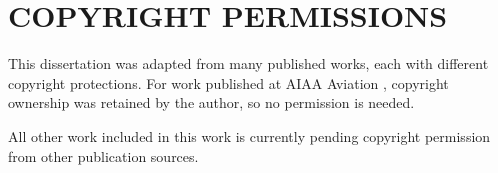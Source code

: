 \documentclass{UCF_ETD}
\begin{document}

\appendix

\chapter{COPYRIGHT PERMISSIONS}
This dissertation was adapted from many published works, each with different copyright protections. For work published at AIAA Aviation \cite{CavainoloAviation24, Cavainolo2023,Cavainolo2022}, copyright ownership was retained by the author, so no permission is needed. 

All other work included in this work is currently pending copyright permission from other publication sources.







\backmatter

\end{document}
